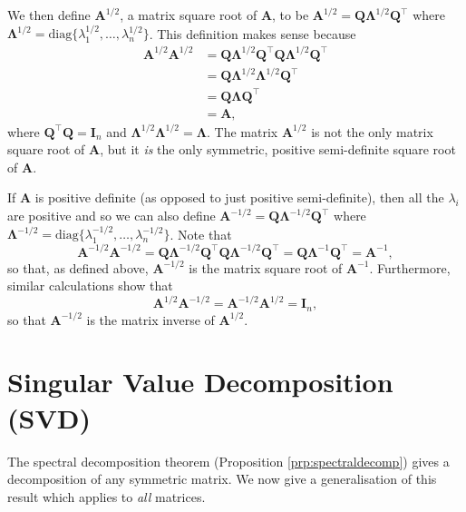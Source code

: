 \documentclass[]{book}
\theoremstyle{definition}
\theoremstyle{definition}
\theoremstyle{definition}
\theoremstyle{remark}
\begin{document}
We then define \({\boldsymbol A}^{1/2}\), a matrix square root of \(\boldsymbol A\), to be \({\boldsymbol A}^{1/2}=\boldsymbol Q\boldsymbol \Lambda^{1/2} \boldsymbol Q^\top\) where \(\boldsymbol \Lambda^{1/2}=\text{diag}\{\lambda_1^{1/2}, \ldots , \lambda_n^{1/2}\}\). This definition makes sense because
\begin{align*}
\boldsymbol A^{1/2}\boldsymbol A^{1/2}&=\boldsymbol Q\boldsymbol \Lambda^{1/2}\boldsymbol Q^\top \boldsymbol Q\boldsymbol \Lambda^{1/2} \boldsymbol Q^\top\\
&=\boldsymbol Q\boldsymbol \Lambda^{1/2}\boldsymbol \Lambda^{1/2}\boldsymbol Q^\top\\
&=\boldsymbol Q\boldsymbol \Lambda\boldsymbol Q^\top\\
&=\boldsymbol A,
\end{align*}
where \(\boldsymbol Q^\top \boldsymbol Q=\mathbf I_n\) and \(\boldsymbol \Lambda^{1/2}\boldsymbol \Lambda^{1/2}=\boldsymbol \Lambda\). The matrix \(\boldsymbol A^{1/2}\) is not the only matrix square root of \(\boldsymbol A\), but it \emph{is} the only symmetric, positive semi-definite square root of \(\boldsymbol A\).

If \(\boldsymbol A\) is positive definite (as opposed to just positive semi-definite), then all the \(\lambda_i\) are positive and so we can also define \(\boldsymbol A^{-1/2}=\boldsymbol Q\boldsymbol \Lambda^{-1/2}\boldsymbol Q^\top\) where \(\boldsymbol \Lambda^{-1/2}=\text{diag}\{\lambda_1^{-1/2},\ldots , \lambda_n^{-1/2}\}\). Note that
\[
\boldsymbol A^{-1/2}\boldsymbol A^{-1/2}=\boldsymbol Q\boldsymbol \Lambda^{-1/2}\boldsymbol Q^\top \boldsymbol Q\boldsymbol \Lambda^{-1/2}\boldsymbol Q^\top =\boldsymbol Q\boldsymbol \Lambda^{-1}\boldsymbol Q^\top=\boldsymbol A^{-1},
\]
so that, as defined above, \(\boldsymbol A^{-1/2}\) is the matrix square root of \(\boldsymbol A^{-1}\). Furthermore, similar calculations show that
\[
\boldsymbol A^{1/2}\boldsymbol A^{-1/2}=\boldsymbol A^{-1/2}\boldsymbol A^{1/2}=\mathbf I_n,
\]
so that \(\boldsymbol A^{-1/2}\) is the matrix inverse of \(\boldsymbol A^{1/2}\).

\hypertarget{linalg-SVD}{%
\section{Singular Value Decomposition (SVD)}\label{linalg-SVD}}

The spectral decomposition theorem (Proposition \ref{prp:spectraldecomp}) gives a decomposition of any symmetric matrix.
We now give a generalisation of this result which applies to \emph{all} matrices.
\end{document}
